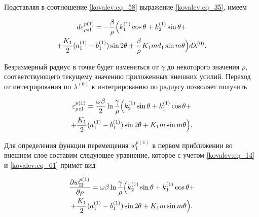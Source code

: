 Подставляя в соотношение \eqref{kovalev:eq_58} выражение \eqref{kovalev:eq_35}, имеем

 \begin{multline} 

\label{kovalev:eq_60}

  d\varepsilon_{\rho z\mathrm{I}}^{p(1)}=-\frac{\beta}{\rho}

  \Bigl(k_1^{(1)}\cos\theta+k_2^{(1)}\sin\theta+ \\ + \frac{K_1}{2} (a_1^{(1)}-b_1^{(1)})\sin2\theta+ 

 \frac{\beta}{\rho} K_1 m d_1\sin m\theta\Bigr)d\lambda^{(0)}.

 \end{multline}



Безразмерный радиус в точке будет изменяться от $\gamma$ до некоторого значения $\rho,$ соответствующего текущему значению приложенных внешних усилий. Переход от интегрирования по $\lambda^{(0)}$  к интегрированию по радиусу позволяет получить 

 \begin{multline}

\label{kovalev:eq_61}

  \varepsilon_{\rho z\mathrm{I}}^{p(1)}=\frac{\omega\beta}{2}\ln\frac{\gamma}{\rho}

\Bigl(k_2^{(1)}\sin\theta + k_1^{(1)}\cos\theta+ \\

+\frac{K_1}{2}(a_1^{(1)}-b_1^{(1)})\sin2\theta+

  K_1 m\sin m\theta\Bigr).

 \end{multline}



Для определения функции перемещения  $w_{\mathrm{I}}^{p(1)}$ в первом приближении во внешнем слое  составим следующее уравнение, которое с учетом \eqref{kovalev:eq_14} и \eqref{kovalev:eq_61} примет вид

 \begin{multline}

\label{kovalev:eq_62}

  \frac{\partial w_{\mathrm{II}}^{p(1)}}{\partial\rho}=\omega\beta\ln\frac{\gamma}{\rho}

\Bigl(k_2^{(1)}\sin\theta+k_1^{(1)}\cos\theta+ \\

+\frac{K_1}{2} (a_1^{(1)} - b_1^{(1)})\sin2\theta +

  K_1 m\sin m\theta \Bigr).

 \end{multline}

